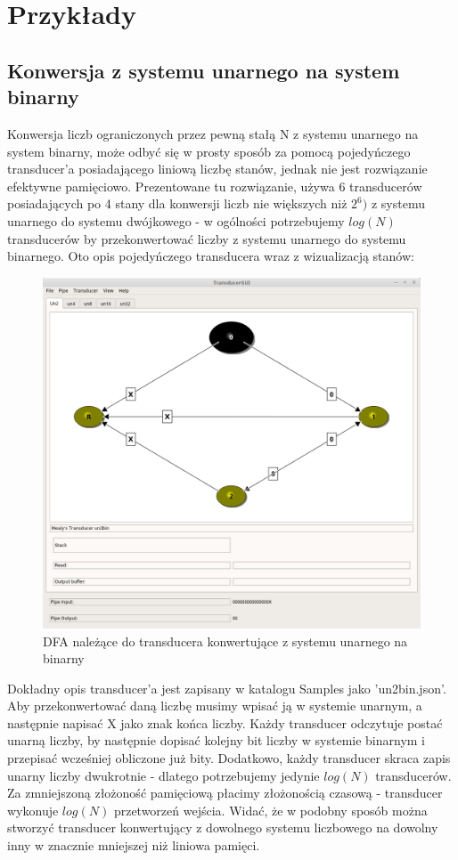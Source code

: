 \documentclass[declaration,shortabstract]{iithesis}
\theoremstyle{definition}
\theoremstyle{plain}
\begin{document}
\section {Przykłady}
\subsection{Konwersja z systemu unarnego na system binarny}
Konwersja liczb ograniczonych przez pewną stałą N z systemu unarnego na system binarny, może odbyć się w prosty sposób za pomocą pojedyńczego transducer'a posiadającego liniową liczbę stanów, jednak nie jest rozwiązanie efektywne pamięciowo. Prezentowane tu rozwiązanie, używa 6 transducerów posiadających po 4 stany dla konwersji liczb nie większych niż \(2^6)\) z systemu unarnego do systemu dwójkowego - w ogólności potrzebujemy \(log(N) \) transducerów by przekonwertować liczby z systemu unarnego do systemu binarnego. Oto opis pojedyńczego transducera wraz z wizualizacją stanów:
\begin{figure}[p]
\centering
\includegraphics[width=\textwidth]{un2bin.png}
\caption{DFA należące do transducera konwertujące z systemu unarnego na binarny}
\label{fig:abc}
\end{figure}
Dokładny opis transducer'a jest zapisany w katalogu Samples jako 'un2bin.json'. Aby przekonwertować daną liczbę musimy wpisać ją w systemie unarnym, a następnie napisać X jako znak końca liczby. Każdy transducer odczytuje postać unarną liczby, by następnie dopisać kolejny bit liczby w systemie binarnym i przepisać wcześniej obliczone już bity. Dodatkowo, każdy transducer skraca zapis unarny liczby dwukrotnie - dlatego potrzebujemy jedynie \(log(N)\) transducerów. Za zmniejszoną złożoność pamięciową płacimy złożonością czasową - transducer wykonuje \(log(N)\) przetworzeń wejścia. Widać, że w podobny sposób można stworzyć transducer konwertujący z dowolnego systemu liczbowego na dowolny inny w znacznie mniejszej niż liniowa pamięci.
\end{document}
